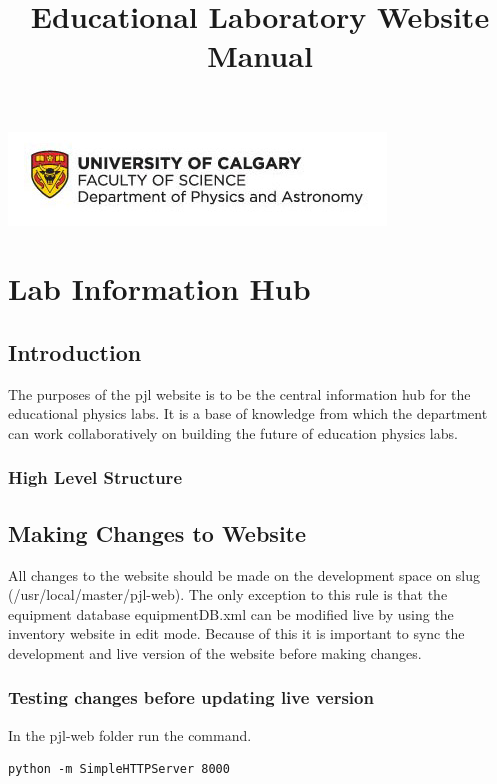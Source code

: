 \documentclass[justified]{book}
\renewcommand{\maketitle}{%
\thispagestyle{fancy}%
{\begin{flushleft} \includegraphics[scale=0.5]{logo} \end{flushleft}}
{\begin{center} \bf \scshape\Large \end{center}}
}%
\begin{document}


\title{Educational Laboratory Website Manual}
\maketitle
\tableofcontents

\chapter{Lab Information Hub}

\section{Introduction}

The purposes of the pjl website is to be the central information hub for the educational physics labs. It is a base of knowledge from which the department can work collaboratively on building the future of education physics labs.

\subsection{High Level Structure}
\newpage

\section{Making Changes to Website}

All changes to the website should be made on the development space on slug (/usr/local/master/pjl-web). The only exception to this rule is that the equipment database equipmentDB.xml can be modified live by using the inventory website in edit mode. Because of this it is important to sync the development and live version of the website before making changes.

\subsection{Testing changes before updating live version}

In the pjl-web folder run the command.

\begin{lstlisting}[backgroundcolor = \color{light-gray}]
python -m SimpleHTTPServer 8000
\end{lstlisting}
\end{document}
